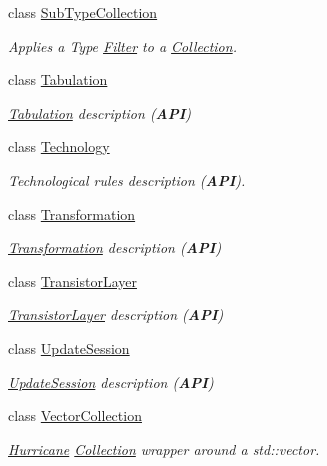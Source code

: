 \begin{DoxyCompactItemize}
class \mbox{\hyperlink{classHurricane_1_1SubTypeCollection}{Sub\+Type\+Collection}}
\begin{DoxyCompactList}\small\item\em Applies a Type \mbox{\hyperlink{classHurricane_1_1Filter}{Filter}} to a \mbox{\hyperlink{classHurricane_1_1Collection}{Collection}}. \end{DoxyCompactList}\item 
class \mbox{\hyperlink{classHurricane_1_1Tabulation}{Tabulation}}
\begin{DoxyCompactList}\small\item\em \mbox{\hyperlink{classHurricane_1_1Tabulation}{Tabulation}} description ({\bfseries A\+PI}) \end{DoxyCompactList}\item 
class \mbox{\hyperlink{classHurricane_1_1Technology}{Technology}}
\begin{DoxyCompactList}\small\item\em Technological rules description ({\bfseries A\+PI}). \end{DoxyCompactList}\item 
class \mbox{\hyperlink{classHurricane_1_1Transformation}{Transformation}}
\begin{DoxyCompactList}\small\item\em \mbox{\hyperlink{classHurricane_1_1Transformation}{Transformation}} description ({\bfseries A\+PI}) \end{DoxyCompactList}\item 
class \mbox{\hyperlink{classHurricane_1_1TransistorLayer}{Transistor\+Layer}}
\begin{DoxyCompactList}\small\item\em \mbox{\hyperlink{classHurricane_1_1TransistorLayer}{Transistor\+Layer}} description ({\bfseries A\+PI}) \end{DoxyCompactList}\item 
class \mbox{\hyperlink{classHurricane_1_1UpdateSession}{Update\+Session}}
\begin{DoxyCompactList}\small\item\em \mbox{\hyperlink{classHurricane_1_1UpdateSession}{Update\+Session}} description ({\bfseries A\+PI}) \end{DoxyCompactList}\item 
class \mbox{\hyperlink{classHurricane_1_1VectorCollection}{Vector\+Collection}}
\begin{DoxyCompactList}\small\item\em \mbox{\hyperlink{namespaceHurricane}{Hurricane}} \mbox{\hyperlink{classHurricane_1_1Collection}{Collection}} wrapper around a std\+::vector. \end{DoxyCompactList}\item 

\end{DoxyCompactItemize}
